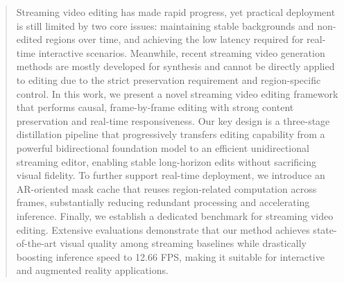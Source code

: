 \begin{abstract}
Streaming video editing has made rapid progress, yet practical deployment is still limited by two core issues: maintaining stable backgrounds and non-edited regions over time, and achieving the low latency required for real-time interactive scenarios. Meanwhile, recent streaming video generation methods are mostly developed for synthesis and cannot be directly applied to editing due to the strict preservation requirement and region-specific control. In this work, we present a novel streaming video editing framework that performs causal, frame-by-frame editing with strong content preservation and real-time responsiveness. Our key design is a three-stage distillation pipeline that progressively transfers editing capability from a powerful bidirectional foundation model to an efficient unidirectional streaming editor, enabling stable long-horizon edits without sacrificing visual fidelity. To further support real-time deployment, we introduce an AR-oriented mask cache that reuses region-related computation across frames, substantially reducing redundant processing and accelerating inference. Finally, we establish a dedicated benchmark for streaming video editing. Extensive evaluations demonstrate that our method achieves state-of-the-art visual quality among streaming baselines while drastically boosting inference speed to 12.66 FPS, making it suitable for interactive and augmented reality applications.
\end{abstract}
